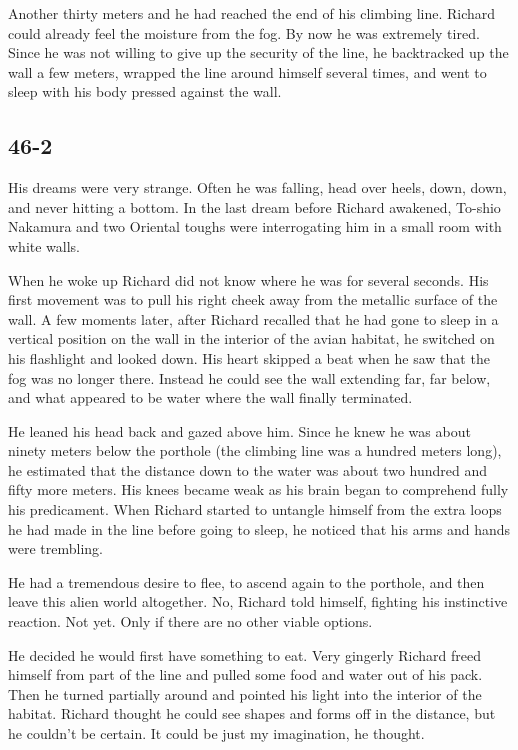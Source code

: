 \documentclass[]{article}
\begin{document}
{Another thirty meters and he had reached the end of his climbing line. Richard could already feel the moisture from the fog. By now he was extremely tired. Since he was not willing to give up the security of the line, he backtracked up the wall a few meters, wrapped the line around himself several times, and went to sleep with his body pressed against the wall.


\subsection{46-2}

His dreams were very strange. Often he was falling, head over heels, down, down, and never hitting a bottom. In the last dream before Richard awakened, To-shio Nakamura and two Oriental toughs were interrogating him in a small room with white walls.

When he woke up Richard did not know where he was for several seconds. His first movement was to pull his right cheek away from the metallic surface of the wall. A few moments later, after Richard recalled that he had gone to sleep in a vertical position on the wall in the interior of the avian habitat, he switched on his flashlight and looked down. His heart skipped a beat when he saw that the fog was no longer there. Instead he could see the wall extending far, far below, and what appeared to be water where the wall finally terminated.

He leaned his head back and gazed above him. Since he knew he was about ninety meters below the porthole (the climbing line was a hundred meters long), he estimated that the distance down to the water was about two hundred and fifty more meters. His knees became weak as his brain began to comprehend fully his predicament. When Richard started to untangle himself from the extra loops he had made in the line before going to sleep, he noticed that his arms and hands were trembling.

He had a tremendous desire to flee, to ascend again to the porthole, and then leave this alien world altogether. No, Richard told himself, fighting his instinctive reaction. Not yet. Only if there are no other viable options.

He decided he would first have something to eat. Very gingerly Richard freed himself from part of the line and pulled some food and water out of his pack. Then he turned partially around and pointed his light into the interior of the habitat. Richard thought he could see shapes and forms off in the distance, but he couldn’t be certain. It could be just my imagination, he thought.

}
\end{document}
